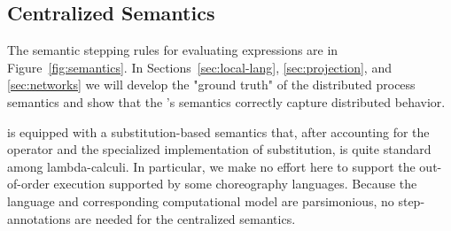 \subsection{Centralized Semantics}\label{sec:semantics}

The semantic stepping rules for evaluating \HLSCentral expressions
are in Figure~\ref{fig:semantics}.
In Sections~\ref{sec:local-lang}, \ref{sec:projection}, and \ref{sec:networks}
we will develop the "ground truth" of the distributed process semantics and show that
the \HLSCentral's semantics correctly capture distributed behavior.

\HLSCentral is equipped with a substitution-based semantics that,
after accounting for the \mask operator and the specialized implementation of
substitution, is quite standard among lambda-calculi.
In particular, we make no effort here to support the out-of-order execution
supported by some choreography languages.
Because the language and corresponding computational model are parsimonious,
no step-annotations are needed for the centralized semantics.

